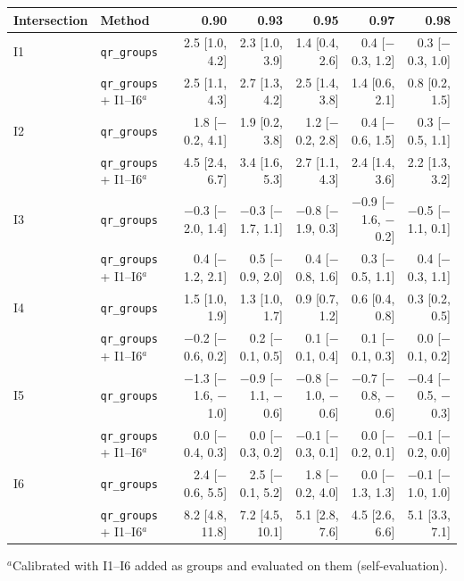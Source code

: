 \setlength{\tabcolsep}{3.0pt}
\begin{tabular}{@{}llrrrrr@{}}
\toprule
Intersection & Method & 0.90 & 0.93 & 0.95 & 0.97 & 0.98 \\
\midrule
I1 & \texttt{qr\_groups} & 2.5 [1.0, 4.2] & 2.3 [1.0, 3.9] & 1.4 [0.4, 2.6] & 0.4 [$-$0.3, 1.2] & 0.3 [$-$0.3, 1.0] \\
 & \texttt{qr\_groups} + I1--I6$^{a}$ & 2.5 [1.1, 4.3] & 2.7 [1.3, 4.2] & 2.5 [1.4, 3.8] & 1.4 [0.6, 2.1] & 0.8 [0.2, 1.5] \\
\addlinespace
I2 & \texttt{qr\_groups} & 1.8 [$-$0.2, 4.1] & 1.9 [0.2, 3.8] & 1.2 [$-$0.2, 2.8] & 0.4 [$-$0.6, 1.5] & 0.3 [$-$0.5, 1.1] \\
 & \texttt{qr\_groups} + I1--I6$^{a}$ & 4.5 [2.4, 6.7] & 3.4 [1.6, 5.3] & 2.7 [1.1, 4.3] & 2.4 [1.4, 3.6] & 2.2 [1.3, 3.2] \\
\addlinespace
I3 & \texttt{qr\_groups} & $-$0.3 [$-$2.0, 1.4] & $-$0.3 [$-$1.7, 1.1] & $-$0.8 [$-$1.9, 0.3] & $-$0.9 [$-$1.6, $-$0.2] & $-$0.5 [$-$1.1, 0.1] \\
 & \texttt{qr\_groups} + I1--I6$^{a}$ & 0.4 [$-$1.2, 2.1] & 0.5 [$-$0.9, 2.0] & 0.4 [$-$0.8, 1.6] & 0.3 [$-$0.5, 1.1] & 0.4 [$-$0.3, 1.1] \\
\addlinespace
I4 & \texttt{qr\_groups} & 1.5 [1.0, 1.9] & 1.3 [1.0, 1.7] & 0.9 [0.7, 1.2] & 0.6 [0.4, 0.8] & 0.3 [0.2, 0.5] \\
 & \texttt{qr\_groups} + I1--I6$^{a}$ & $-$0.2 [$-$0.6, 0.2] & 0.2 [$-$0.1, 0.5] & 0.1 [$-$0.1, 0.4] & 0.1 [$-$0.1, 0.3] & 0.0 [$-$0.1, 0.2] \\
\addlinespace
I5 & \texttt{qr\_groups} & $-$1.3 [$-$1.6, $-$1.0] & $-$0.9 [$-$1.1, $-$0.6] & $-$0.8 [$-$1.0, $-$0.6] & $-$0.7 [$-$0.8, $-$0.6] & $-$0.4 [$-$0.5, $-$0.3] \\
 & \texttt{qr\_groups} + I1--I6$^{a}$ & 0.0 [$-$0.4, 0.3] & 0.0 [$-$0.3, 0.2] & $-$0.1 [$-$0.3, 0.1] & 0.0 [$-$0.2, 0.1] & $-$0.1 [$-$0.2, 0.0] \\
\addlinespace
I6 & \texttt{qr\_groups} & 2.4 [$-$0.6, 5.5] & 2.5 [$-$0.1, 5.2] & 1.8 [$-$0.2, 4.0] & 0.0 [$-$1.3, 1.3] & $-$0.1 [$-$1.0, 1.0] \\
 & \texttt{qr\_groups} + I1--I6$^{a}$ & 8.2 [4.8, 11.8] & 7.2 [4.5, 10.1] & 5.1 [2.8, 7.6] & 4.5 [2.6, 6.6] & 5.1 [3.3, 7.1] \\
\bottomrule
\end{tabular}

\smallskip\parbox{\linewidth}{\footnotesize $^{a}$Calibrated with I1--I6 added as groups and evaluated on them (self-evaluation).}
